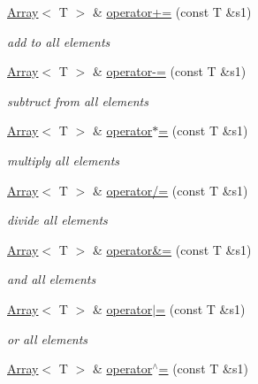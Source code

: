 \begin{DoxyCompactItemize}
\mbox{\hyperlink{classXMLArray_1_1Array}{Array}}$<$ T $>$ \& \mbox{\hyperlink{classXMLArray_1_1Array_ad3487cb84f2a45cc24ed06f5e96a62ee}{operator+=}} (const T \&s1)
\begin{DoxyCompactList}\small\item\em add to all elements \end{DoxyCompactList}\item 
\mbox{\hyperlink{classXMLArray_1_1Array}{Array}}$<$ T $>$ \& \mbox{\hyperlink{classXMLArray_1_1Array_af903951b5031ab6aa7ee8e2682055f91}{operator-\/=}} (const T \&s1)
\begin{DoxyCompactList}\small\item\em subtruct from all elements \end{DoxyCompactList}\item 
\mbox{\hyperlink{classXMLArray_1_1Array}{Array}}$<$ T $>$ \& \mbox{\hyperlink{classXMLArray_1_1Array_a4afa4c469f84b40f88c27273602528cc}{operator$\ast$=}} (const T \&s1)
\begin{DoxyCompactList}\small\item\em multiply all elements \end{DoxyCompactList}\item 
\mbox{\hyperlink{classXMLArray_1_1Array}{Array}}$<$ T $>$ \& \mbox{\hyperlink{classXMLArray_1_1Array_add7ef0354bf795511a654f1241da3318}{operator/=}} (const T \&s1)
\begin{DoxyCompactList}\small\item\em divide all elements \end{DoxyCompactList}\item 
\mbox{\hyperlink{classXMLArray_1_1Array}{Array}}$<$ T $>$ \& \mbox{\hyperlink{classXMLArray_1_1Array_a7f264e277398588e0e37763573f48fc7}{operator\&=}} (const T \&s1)
\begin{DoxyCompactList}\small\item\em and all elements \end{DoxyCompactList}\item 
\mbox{\hyperlink{classXMLArray_1_1Array}{Array}}$<$ T $>$ \& \mbox{\hyperlink{classXMLArray_1_1Array_a719213ff71df03fd3e561d1d4f9656cc}{operator$\vert$=}} (const T \&s1)
\begin{DoxyCompactList}\small\item\em or all elements \end{DoxyCompactList}\item 
\mbox{\hyperlink{classXMLArray_1_1Array}{Array}}$<$ T $>$ \& \mbox{\hyperlink{classXMLArray_1_1Array_ac68e4b59911e762c271c90a6aa81e0c3}{operator$^\wedge$=}} (const T \&s1)

\end{DoxyCompactItemize}
